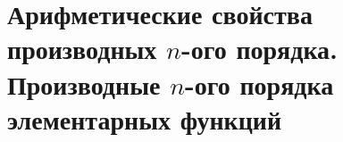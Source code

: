 \section{Арифметические свойства производных $n$-ого порядка. Производные $n$-ого порядка элементарных функций}
